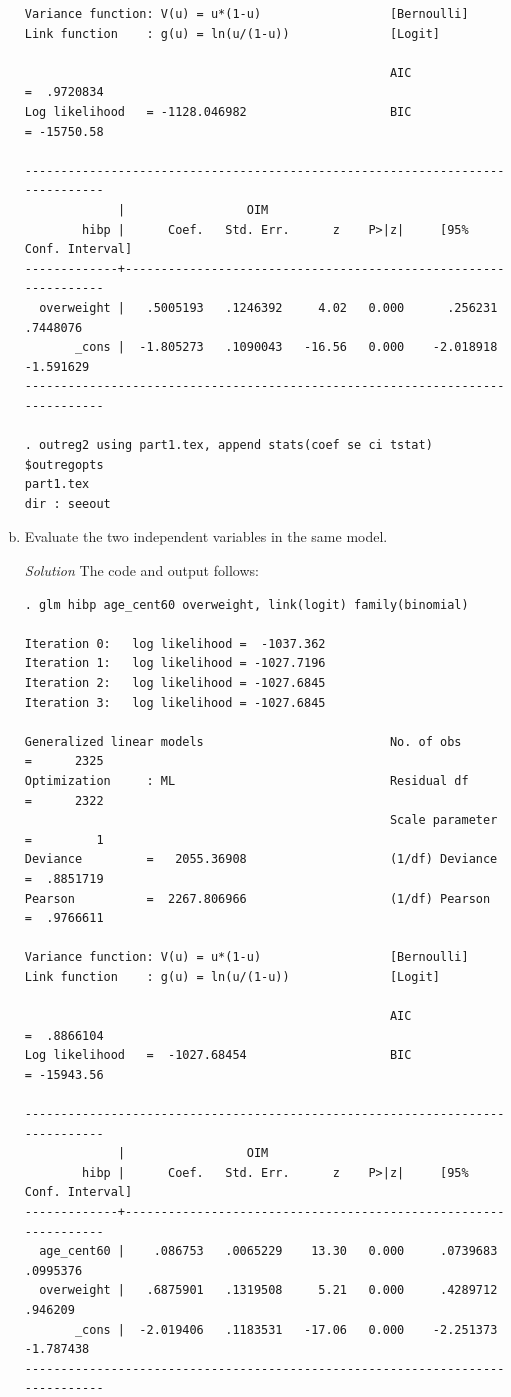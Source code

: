 \documentclass{article}
\begin{document}
\begin{enumerate}[a.]
\begin{verbatim}
Variance function: V(u) = u*(1-u)                  [Bernoulli]
Link function    : g(u) = ln(u/(1-u))              [Logit]

                                                   AIC             =  .9720834
Log likelihood   = -1128.046982                    BIC             = -15750.58

------------------------------------------------------------------------------
             |                 OIM
        hibp |      Coef.   Std. Err.      z    P>|z|     [95% Conf. Interval]
-------------+----------------------------------------------------------------
  overweight |   .5005193   .1246392     4.02   0.000      .256231    .7448076
       _cons |  -1.805273   .1090043   -16.56   0.000    -2.018918   -1.591629
------------------------------------------------------------------------------

. outreg2 using part1.tex, append stats(coef se ci tstat) $outregopts
part1.tex
dir : seeout
\end{verbatim}
     
     \item  Evaluate the two independent variables in the same model.
     
     \textit{Solution} The code and output follows:
     
\begin{verbatim}
. glm hibp age_cent60 overweight, link(logit) family(binomial)

Iteration 0:   log likelihood =  -1037.362  
Iteration 1:   log likelihood = -1027.7196  
Iteration 2:   log likelihood = -1027.6845  
Iteration 3:   log likelihood = -1027.6845  

Generalized linear models                          No. of obs      =      2325
Optimization     : ML                              Residual df     =      2322
                                                   Scale parameter =         1
Deviance         =   2055.36908                    (1/df) Deviance =  .8851719
Pearson          =  2267.806966                    (1/df) Pearson  =  .9766611

Variance function: V(u) = u*(1-u)                  [Bernoulli]
Link function    : g(u) = ln(u/(1-u))              [Logit]

                                                   AIC             =  .8866104
Log likelihood   =  -1027.68454                    BIC             = -15943.56

------------------------------------------------------------------------------
             |                 OIM
        hibp |      Coef.   Std. Err.      z    P>|z|     [95% Conf. Interval]
-------------+----------------------------------------------------------------
  age_cent60 |    .086753   .0065229    13.30   0.000     .0739683    .0995376
  overweight |   .6875901   .1319508     5.21   0.000     .4289712     .946209
       _cons |  -2.019406   .1183531   -17.06   0.000    -2.251373   -1.787438
------------------------------------------------------------------------------


\end{verbatim}
\end{enumerate}
\end{document}
